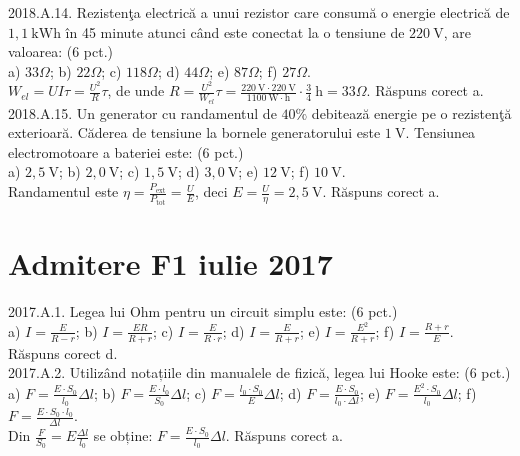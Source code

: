 2018.A.14. Rezistenţa electrică a unui rezistor care consumă o energie electrică de $1,1 \mathrm{~kWh}$ în 45 minute atunci când este conectat la o tensiune de $220 \mathrm{~V}$, are valoarea: (6 pct.)\\ a) $33 \Omega$; b) $22 \Omega$; c) $118 \Omega$; d) $44 \Omega$; e) $87 \Omega$; f) $27 \Omega$.\\  $W_{el}=U I \tau=\frac{U^{2}}{R} \tau$, de unde $R=\frac{U^{2}}{W_{el}} \tau=\frac{220 \mathrm{~V} \cdot 220 \mathrm{~V}}{1100 \mathrm{~W} \cdot \mathrm{h}} \cdot \frac{3}{4} \mathrm{~h}=33 \Omega$. Răspuns corect a.\\

2018.A.15. Un generator cu randamentul de $40 \%$ debitează energie pe o rezistenţă exterioară. Căderea de tensiune la bornele generatorului este $1 \mathrm{~V}$. Tensiunea electromotoare a bateriei este: (6 pct.)\\ a) $2,5 \mathrm{~V}$; b) $2,0 \mathrm{~V}$; c) $1,5 \mathrm{~V}$; d) $3,0 \mathrm{~V}$; e) $12 \mathrm{~V}$; f) $10 \mathrm{~V}$.\\ Randamentul este $\eta=\frac{P_{\text {ext}}}{P_{\text {tot}}}=\frac{U}{E}$, deci $E=\frac{U}{\eta}=2,5 \mathrm{~V}$. Răspuns corect a.\\

\section{Admitere F1 iulie 2017}

2017.A.1. Legea lui Ohm pentru un circuit simplu este: (6 pct.)\\ a) $I=\frac{E}{R-r}$; b) $I=\frac{E R}{R+r}$; c) $I=\frac{E}{R \cdot r}$; d) $I=\frac{E}{R+r}$; e) $I=\frac{E^{2}}{R+r}$; f) $I=\frac{R+r}{E}$.\\ Răspuns corect d.\\

2017.A.2. Utilizând notațiile din manualele de fizică, legea lui Hooke este: (6 pct.)\\ a) $F=\frac{E \cdot S_{0}}{l_{0}} \Delta l$; b) $F=\frac{E \cdot l_{0}}{S_{0}} \Delta l$; c) $F=\frac{l_{0} \cdot S_{0}}{E} \Delta l$; d) $F=\frac{E \cdot S_{0}}{l_{0} \cdot \Delta l}$; e) $F=\frac{E^{2} \cdot S_{0}}{l_{0}} \Delta l$; f) $F=\frac{E \cdot S_{0} \cdot l_{0}}{\Delta l}$.\\ Din $\frac{F}{S_{0}}=E \frac{\Delta l}{l_{0}}$ se obține: $F=\frac{E \cdot S_{0}}{l_{0}} \Delta l$. Răspuns corect a.\\

